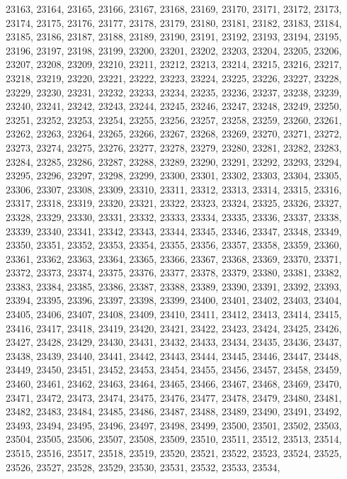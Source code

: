 23163,
23164,
23165,
23166,
23167,
23168,
23169,
23170,
23171,
23172,
23173,
23174,
23175,
23176,
23177,
23178,
23179,
23180,
23181,
23182,
23183,
23184,
23185,
23186,
23187,
23188,
23189,
23190,
23191,
23192,
23193,
23194,
23195,
23196,
23197,
23198,
23199,
23200,
23201,
23202,
23203,
23204,
23205,
23206,
23207,
23208,
23209,
23210,
23211,
23212,
23213,
23214,
23215,
23216,
23217,
23218,
23219,
23220,
23221,
23222,
23223,
23224,
23225,
23226,
23227,
23228,
23229,
23230,
23231,
23232,
23233,
23234,
23235,
23236,
23237,
23238,
23239,
23240,
23241,
23242,
23243,
23244,
23245,
23246,
23247,
23248,
23249,
23250,
23251,
23252,
23253,
23254,
23255,
23256,
23257,
23258,
23259,
23260,
23261,
23262,
23263,
23264,
23265,
23266,
23267,
23268,
23269,
23270,
23271,
23272,
23273,
23274,
23275,
23276,
23277,
23278,
23279,
23280,
23281,
23282,
23283,
23284,
23285,
23286,
23287,
23288,
23289,
23290,
23291,
23292,
23293,
23294,
23295,
23296,
23297,
23298,
23299,
23300,
23301,
23302,
23303,
23304,
23305,
23306,
23307,
23308,
23309,
23310,
23311,
23312,
23313,
23314,
23315,
23316,
23317,
23318,
23319,
23320,
23321,
23322,
23323,
23324,
23325,
23326,
23327,
23328,
23329,
23330,
23331,
23332,
23333,
23334,
23335,
23336,
23337,
23338,
23339,
23340,
23341,
23342,
23343,
23344,
23345,
23346,
23347,
23348,
23349,
23350,
23351,
23352,
23353,
23354,
23355,
23356,
23357,
23358,
23359,
23360,
23361,
23362,
23363,
23364,
23365,
23366,
23367,
23368,
23369,
23370,
23371,
23372,
23373,
23374,
23375,
23376,
23377,
23378,
23379,
23380,
23381,
23382,
23383,
23384,
23385,
23386,
23387,
23388,
23389,
23390,
23391,
23392,
23393,
23394,
23395,
23396,
23397,
23398,
23399,
23400,
23401,
23402,
23403,
23404,
23405,
23406,
23407,
23408,
23409,
23410,
23411,
23412,
23413,
23414,
23415,
23416,
23417,
23418,
23419,
23420,
23421,
23422,
23423,
23424,
23425,
23426,
23427,
23428,
23429,
23430,
23431,
23432,
23433,
23434,
23435,
23436,
23437,
23438,
23439,
23440,
23441,
23442,
23443,
23444,
23445,
23446,
23447,
23448,
23449,
23450,
23451,
23452,
23453,
23454,
23455,
23456,
23457,
23458,
23459,
23460,
23461,
23462,
23463,
23464,
23465,
23466,
23467,
23468,
23469,
23470,
23471,
23472,
23473,
23474,
23475,
23476,
23477,
23478,
23479,
23480,
23481,
23482,
23483,
23484,
23485,
23486,
23487,
23488,
23489,
23490,
23491,
23492,
23493,
23494,
23495,
23496,
23497,
23498,
23499,
23500,
23501,
23502,
23503,
23504,
23505,
23506,
23507,
23508,
23509,
23510,
23511,
23512,
23513,
23514,
23515,
23516,
23517,
23518,
23519,
23520,
23521,
23522,
23523,
23524,
23525,
23526,
23527,
23528,
23529,
23530,
23531,
23532,
23533,
23534,
